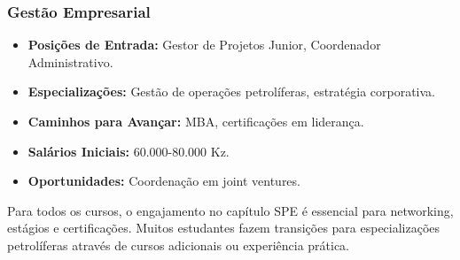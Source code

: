 \documentclass[12pt]{article}
\begin{document}
\subsubsection{Gestão Empresarial}
\begin{itemize}
    \item \textbf{Posições de Entrada:} Gestor de Projetos Junior, Coordenador Administrativo.
    \item \textbf{Especializações:} Gestão de operações petrolíferas, estratégia corporativa.
    \item \textbf{Caminhos para Avançar:} MBA, certificações em liderança.
    \item \textbf{Salários Iniciais:} 60.000-80.000 Kz.
    \item \textbf{Oportunidades:} Coordenação em joint ventures.
\end{itemize}

Para todos os cursos, o engajamento no capítulo SPE é essencial para networking, estágios e certificações. Muitos estudantes fazem transições para especializações petrolíferas através de cursos adicionais ou experiência prática.
\end{document}
